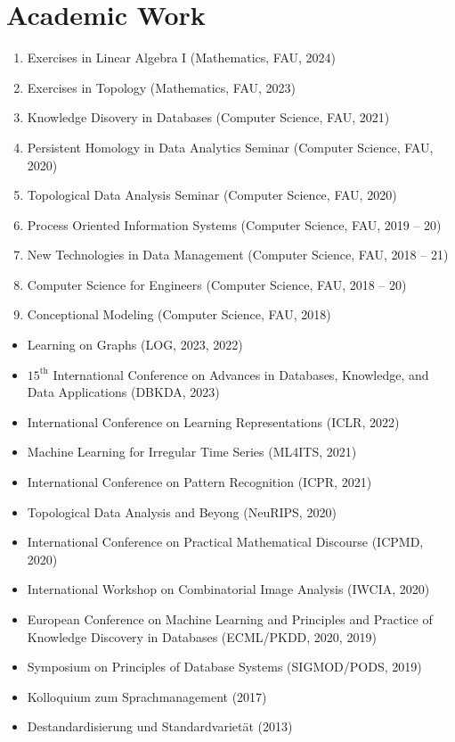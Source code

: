 \documentclass[a4paper,11pt]{article}
\newcommand{\years}[1]{\marginnote{\scriptsize #1}}
\begin{document}
\section*{Academic Work}
\years{Lectures}
\vspace{-2pt}
\begin{enumerate}[noitemsep, leftmargin=*]
    \item Exercises in Linear Algebra I (Mathematics, FAU, 2024)
    \item Exercises in Topology (Mathematics, FAU, 2023)
    \item Knowledge Disovery in Databases (Computer Science, FAU, 2021)
    \item Persistent Homology in Data Analytics Seminar (Computer Science, FAU, 2020)
    \item Topological Data Analysis Seminar (Computer Science, FAU, 2020)
    \item Process Oriented Information Systems (Computer Science, FAU, 2019 -- 20)
    \item New Technologies in Data Management (Computer Science, FAU, 2018 -- 21)
    \item Computer Science for Engineers (Computer Science, FAU, 2018 -- 20)
    \item Conceptional Modeling (Computer Science, FAU, 2018)
\end{enumerate}
\vspace{10pt}

\years{Conferences}
\vspace{-2pt}
\begin{itemize}[noitemsep, leftmargin=*]
    \item Learning on Graphs (LOG, 2023, 2022)
    \item $15^{\text{th}}$ International Conference on Advances in Databases, Knowledge,
and Data Applications (DBKDA, 2023)
    \item International Conference on Learning Representations (ICLR, 2022)
    \item Machine Learning for Irregular Time Series (ML4ITS, 2021)
    \item International Conference on Pattern Recognition (ICPR, 2021)
    \item Topological Data Analysis and Beyong (NeuRIPS, 2020)
    \item International Conference on Practical Mathematical Discourse (ICPMD, 2020)
    \item International Workshop on Combinatorial Image Analysis (IWCIA, 2020)
    \item European Conference on Machine Learning and Principles and Practice of Knowledge Discovery in Databases (ECML/PKDD, 2020, 2019)
    \item Symposium on Principles of Database Systems (SIGMOD/PODS, 2019)
    \item Kolloquium zum Sprachmanagement (2017)
    \item Destandardisierung und Standardvarietät (2013)
\end{itemize}
\vspace{10pt}
\end{document}
